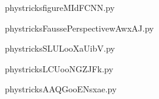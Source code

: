     

    \clearpage
    


    \newcommand{\CaptionFigfigureMIdFCNN}{<+Type your caption here+>}
    \begin{center}
        
    \end{center}
    phystricksfigureMIdFCNN.py

    

    \clearpage
    


    \newcommand{\CaptionFigFaussePerspectivewAwxAJ}{<+Type your caption here+>}
    \begin{center}
        
    \end{center}
    phystricksFaussePerspectivewAwxAJ.py

    

    \clearpage
    


    \newcommand{\CaptionFigSLULooXaUibV}{<+Type your caption here+>}
    \begin{center}
        
    \end{center}
    phystricksSLULooXaUibV.py

    

    \clearpage
    


    \newcommand{\CaptionFigLCUooNGZJFk}{<+Type your caption here+>}
    \begin{center}
        
    \end{center}
    phystricksLCUooNGZJFk.py

    

    \clearpage
    


    \newcommand{\CaptionFigAAQGooENsxae}{<+Type your caption here+>}
    \begin{center}
        
    \end{center}
    phystricksAAQGooENsxae.py

    

    \clearpage
    


